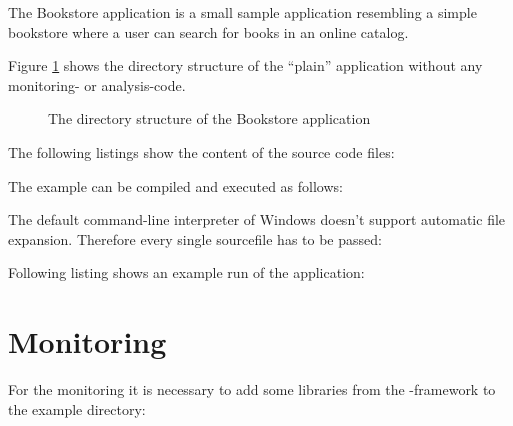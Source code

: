 The Bookstore application is a small sample application resembling a simple
bookstore where a user can search for books in an online catalog.

Figure \ref{Figure:PlainBookstoreExample} shows the directory structure of the ``plain'' application without any monitoring- or analysis-code.

\begin{figure}[H]
\vspace{1ex}


\caption{The directory structure of the Bookstore application}
\label{Figure:PlainBookstoreExample}
\end{figure}

The following listings show the content of the source code files:


\setJavaCodeListing





The example can be compiled and executed as follows:
\setBashListing

\warning The default command-line interpreter of Windows doesn't support automatic file expansion. Therefore every single sourcefile has to be passed:

Following listing shows an example run of the application:


\section{Monitoring}\label{sec:example:monitoring}
For the monitoring it is necessary to add some libraries from the \Kieker-framework to the example directory:
\begin{figure}[H]

\vspace{1ex}
\vspace{1ex}
\end{figure}

